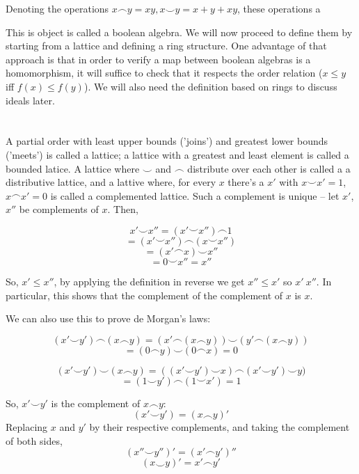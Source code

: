 \documentclass{article}
\begin{document}
    Denoting the operations $x \frown y = xy, x \smile y = x + y + xy$, these
    operations a

    This is object is called a boolean algebra. We will now proceed to define
    them by starting from a lattice and defining a ring structure. One advantage
    of that approach is that in order to verify a map between boolean algebras
    is a homomorphism, it will suffice to check that it respects the order
    relation ($x \leq y$ iff $f(x) \leq f(y)$). We will also need the definition
    based on rings to discuss ideals later.

    \section{}

    A partial order with least upper bounds ('joins') and greatest lower bounds
    ('meets') is called a lattice; a lattice with a greatest and least element
    is called a bounded latice. A lattice where $\smile$ and $\frown$ distribute
    over each other is called a a distributive lattice, and a lattive where, for
    every $x$ there's a $x'$ with $x \smile x' = 1$, $x \frown x' = 0$ is called
    a complemented lattice. Such a complement is unique -- let $x'$, $x''$ be
    complements of $x$. Then,

    \[x' \smile x'' = (x' \smile  x'') \frown 1\]
    \[= (x' \smile  x'') \frown (x \smile x'')\]
    \[= (x' \frown x) \smile x''\]
    \[= 0 \smile x'' = x''\]

    So, $x' \leq x''$, by applying the definition in reverse we get $x'' \leq
    x'$ so $x' \ x''$. In particular, this shows that the complement of the
    complement of $x$ is $x$.

    We can also use this to prove de Morgan's laws:

    \[(x' \smile y') \frown (x \frown y) = (x' \frown (x \frown y)) \smile (y'
    \frown (x \frown y))\]
    \[ = (0 \frown y) \smile (0 \frown x) = 0\]

    \[(x' \smile y') \smile (x \frown y) = ((x' \smile y') \smile x) \frown (x'
    \smile y') \smile y)\]
    \[ = (1 \smile y') \frown (1 \smile x') = 1\]

    So, $x' \smile y'$ is the complement of $x \frown y$:
    \[(x' \smile y') = (x \frown y)'\]
    Replacing $x$ and $y'$ by their respective complements, and taking the
    complement of both sides,
    \[(x'' \smile y'')' = (x' \frown y')''\]
    \[(x \smile y)' = x' \frown y'\]
\end{document}
